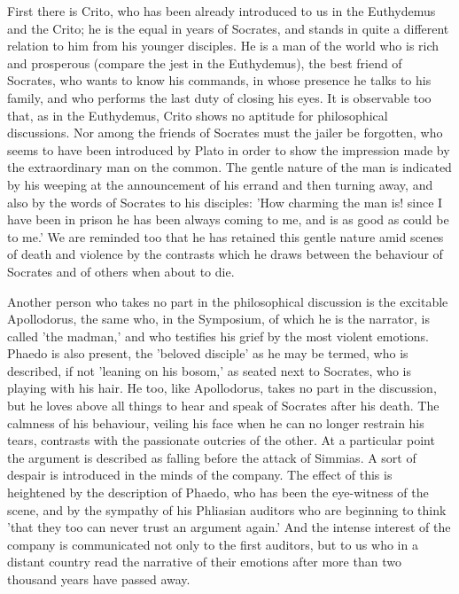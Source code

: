 First there is Crito, who has been already introduced to us in the
Euthydemus and the Crito; he is the equal in years of Socrates, and
stands in quite a different relation to him from his younger disciples.
He is a man of the world who is rich and prosperous (compare the jest
in the Euthydemus), the best friend of Socrates, who wants to know his
commands, in whose presence he talks to his family, and who performs
the last duty of closing his eyes. It is observable too that, as in the
Euthydemus, Crito shows no aptitude for philosophical discussions. Nor
among the friends of Socrates must the jailer be forgotten, who seems
to have been introduced by Plato in order to show the impression made
by the extraordinary man on the common. The gentle nature of the man
is indicated by his weeping at the announcement of his errand and then
turning away, and also by the words of Socrates to his disciples: 'How
charming the man is! since I have been in prison he has been always
coming to me, and is as good as could be to me.' We are reminded
too that he has retained this gentle nature amid scenes of death and
violence by the contrasts which he draws between the behaviour of
Socrates and of others when about to die.

Another person who takes no part in the philosophical discussion is the
excitable Apollodorus, the same who, in the Symposium, of which he is
the narrator, is called 'the madman,' and who testifies his grief by the
most violent emotions. Phaedo is also present, the 'beloved disciple'
as he may be termed, who is described, if not 'leaning on his bosom,'
as seated next to Socrates, who is playing with his hair. He too, like
Apollodorus, takes no part in the discussion, but he loves above all
things to hear and speak of Socrates after his death. The calmness
of his behaviour, veiling his face when he can no longer restrain
his tears, contrasts with the passionate outcries of the other. At a
particular point the argument is described as falling before the attack
of Simmias. A sort of despair is introduced in the minds of the company.
The effect of this is heightened by the description of Phaedo, who has
been the eye-witness of the scene, and by the sympathy of his Phliasian
auditors who are beginning to think 'that they too can never trust an
argument again.' And the intense interest of the company is communicated
not only to the first auditors, but to us who in a distant country read
the narrative of their emotions after more than two thousand years have
passed away.

